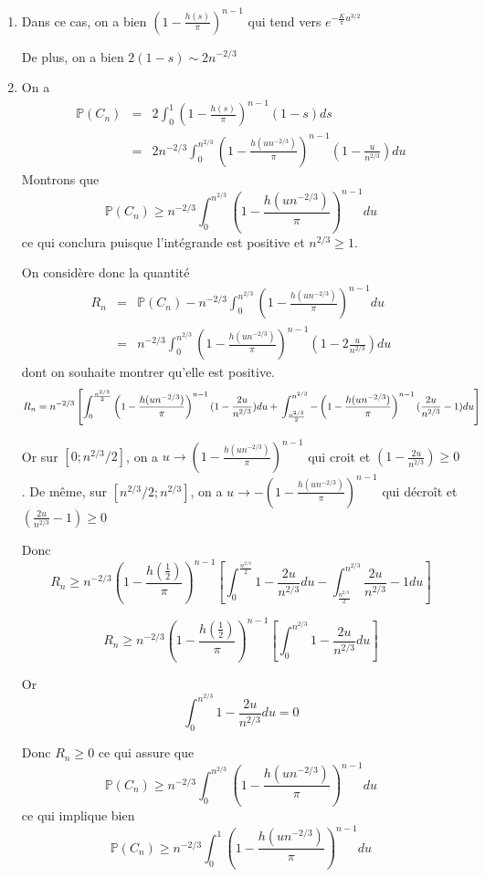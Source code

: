 \documentclass[a4paper,12pt,twoside]{article}
\newcommand{\p}{\mathbb{P}}
\begin{document}
\begin{enumerate}
		\item Dans ce cas, on a bien $\left(1 - \frac{h(s)}{\pi}\right)^{n-1}$ qui tend vers $e^{-\frac{K}{\pi}u^{3/2}}$

		De plus, on a bien $2(1-s) \sim 2n^{-2/3}$

		\item On a 
		\begin{eqnarray}
			\p(C_n) &=& 2\int_0^1 \left( 1-\frac{h(s)}{\pi} \right)^{n-1}(1-s)ds \\
				&=& 2n^{-2/3}\int_0^{n^{2/3}} \left(1-\frac{h(un^{-2/3})}{\pi}\right)^{n-1}(1-\frac{u}{n^{2/3}})du
		\end{eqnarray}
		Montrons que $$\p(C_n) \geq n^{-2/3}\int_0^{n^{2/3}} \left(1-\frac{h(un^{-2/3})}{\pi}\right)^{n-1}du $$ ce qui conclura puisque l'intégrande est positive et $n^{2/3} \geq 1$. 
		
		On considère donc la quantité
		\begin{eqnarray}
		R_n	&=& \p(C_n) - n^{-2/3}\int_0^{n^{2/3}} \left(1-\frac{h(un^{-2/3})}{\pi}\right)^{n-1}du \\
			&=& n^{-2/3}\int_0^{n^{2/3}} \left(1-\frac{h(un^{-2/3})}{\pi}\right)^{n-1}(1-2\frac{u}{n^{2/3}})du 
		\end{eqnarray}
		dont on souhaite montrer qu'elle est positive.\\	
		$$R_n = n^{-2/3}\left[\int_0^{\frac{n^{2/3}}{2}} \left(1-\frac{h(un^{-2/3})}{\pi}\right)^{n-1}(1-\frac{2u}{n^{2/3}})du +  \\
		  \int_{\frac{n^{2/3}}{2}}^{n^{2/3}} -\left(1-\frac{h(un^{-2/3})}{\pi}\right)^{n-1}(\frac{2u}{n^{2/3}}-1)du \right]$$
		  
	Or sur $[0;n^{2/3}/2]$, on a $u \rightarrow \left(1-\frac{h(un^{-2/3})}{\pi}\right)^{n-1}$ qui croit et $(1-\frac{2u}{n^{2/3}})\geq 0$. De même, sur $[n^{2/3}/2;n^{2/3}]$, on a $u \rightarrow -\left(1-\frac{h(un^{-2/3})}{\pi}\right)^{n-1}$ qui décroît et $(\frac{2u}{n^{2/3}}-1)\geq 0$
		  
		 Donc $$R_n \geq n^{-2/3}\left(1-\frac{h(\frac{1}{2})}{\pi}\right)^{n-1}\left[\int_0^{\frac{n^{2/3}}{2}} 1-\frac{2u}{n^{2/3}}du - 		
		  \int_{\frac{n^{2/3}}{2}}^{n^{2/3}}\frac{2u}{n^{2/3}}-1du \right]$$
			
$$R_n \geq n^{-2/3}\left(1-\frac{h(\frac{1}{2})}{\pi}\right)^{n-1}\left[\int_0^{n^{2/3}} 1-\frac{2u}{n^{2/3}}du \right] $$

Or $$\int_0^{n^{2/3}} 1-\frac{2u}{n^{2/3}}du  = 0$$

Donc $R_n \geq 0$  ce qui assure que $$\p(C_n) \geq n^{-2/3}\int_0^{n^{2/3}} \left(1-\frac{h(un^{-2/3})}{\pi}\right)^{n-1}du $$ ce qui implique bien $$\p(C_n) \geq n^{-2/3}\int_0^{1} \left(1-\frac{h(un^{-2/3})}{\pi}\right)^{n-1}du $$



\end{enumerate}
\end{document}
